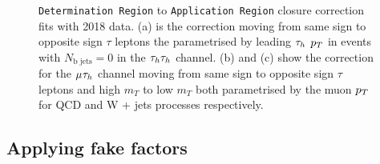 \begin{figure}[!hbtp]
\centering
\caption[Plots of fake factor \texttt{Determination Region} to \texttt{Application Region} closure correction fits.]{\texttt{Determination Region} to \texttt{Application Region} closure correction fits with 2018 data. (a) is the correction moving from same sign to opposite sign $\tau$ leptons the parametrised by leading $\tau_{h}$ $p_{T}$ in events with $N_{\text{b jets}}=0$ in the $\tau_{h}\tau_{h}$ channel. (b) and (c) show the correction for the $\mu_{}\tau_{h}$ channel moving from same sign to opposite sign $\tau$ leptons and high $m_{T}$ to low $m_{T}$ both parametrised by the muon $p_{T}$ for QCD and W + jets processes respectively.}
\label{fig:ff_dr_to_ar}
\end{figure}

\subsection{Applying fake factors}
\label{sec:ff_applying}

